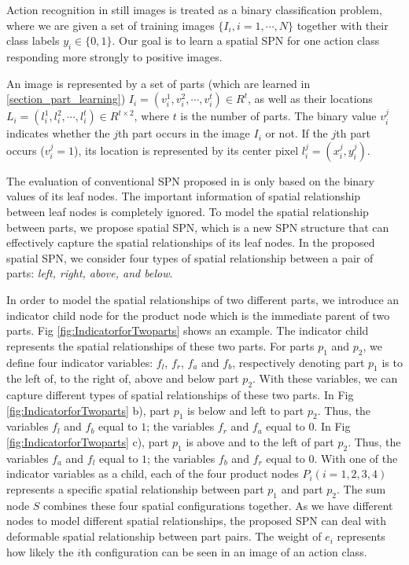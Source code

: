 \documentclass[journal]{IEEEtran}
\begin{document}
Action recognition in still images is treated as a binary classification problem, where we are given a set of training images $  \{ I_i, i=1,\cdots, N \} $ together with their class labels $ y_i \in \{ 0,1 \} $. Our goal is to learn a spatial SPN for one action class responding more strongly to positive images.




An image is represented by a set of parts (which are learned in \ref{section_part_learning}) $ I_i = (v_i^1,v_i^2, \cdots, v_i^t) \in R^t $, as well as their locations $L_i=(l_i^1,l_i^2, \cdots , l_i^t) \in R^{t\times 2}$, where $ t $ is the number of parts. The binary value $ v_i^j $ indicates whether the $ j $th part occurs in the image $ I_i $ or not. If the $ j $th part occurs ($ v_i^j=1 $), its location is represented by its center pixel $ l_i^j=(x_i^j,y_i^j) $.


The evaluation of conventional SPN proposed in \cite{poon2011SPNIntroduce} is only based on the binary values of its leaf nodes. The important information of spatial relationship between leaf nodes is completely ignored.
To model the spatial relationship between parts, we propose spatial SPN, which is a new SPN structure that can effectively capture the spatial relationships of its leaf nodes. In the proposed spatial SPN, we consider four types of spatial relationship between a pair of parts: \textit{left, right, above, and below}.





In order to model the spatial relationships of two different parts, we introduce an indicator child node for the product node which is the immediate parent of two parts. Fig \ref{fig:IndicatorforTwoparts} shows an example. The indicator child represents the spatial relationships of these two parts. For parts $ p_1 $ and $ p_2 $, we define four indicator variables: $ f_{l} $, $ f_r $, $ f_a $ and $ f_{b} $, respectively denoting part $ p_1 $ is to the left of, to the right of, above and below part $ p_2 $. With these variables, we can capture different types of spatial relationships of these two parts. In Fig \ref{fig:IndicatorforTwoparts} b), part $ p_1 $ is below and left to part $ p_2 $. Thus, the variables $ f_l $ and $ f_b $ equal to $ 1 $; the variables $ f_r $ and $ f_a $ equal to $ 0 $. In Fig \ref{fig:IndicatorforTwoparts} c), part $ p_1 $ is above and to the left of part $ p_2 $. Thus, the variables $ f_a $ and $ f_l $ equal to $ 1 $; the variables $ f_b $ and $ f_r $ equal to $ 0 $. With one of the indicator variables as a child, each of the four product nodes $ P_i(i=1,2,3,4) $ represents a specific spatial relationship between part $ p_1 $ and part $ p_2 $. The sum node $ S $ combines these four spatial configurations together. As we have different nodes to model different spatial relationships, the proposed SPN can deal with deformable spatial relationship between part pairs.
The weight of $ e_i $  represents how likely the $ i $th configuration can be seen in an image of an action class.
\end{document}
